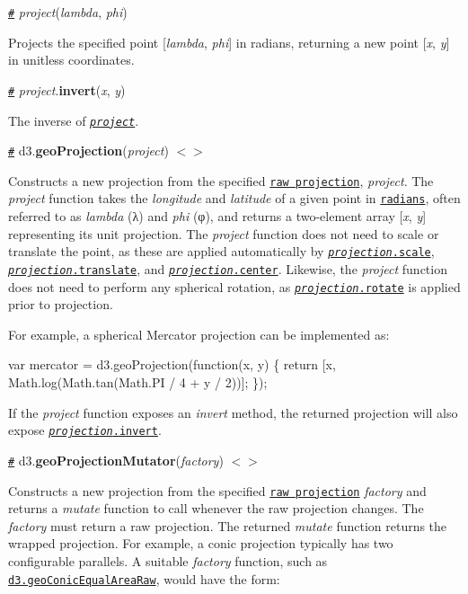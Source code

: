 \href{#_project}{\tt \#} {\itshape project}({\itshape lambda}, {\itshape phi})

Projects the specified point \mbox{[}{\itshape lambda}, {\itshape phi}\mbox{]} in radians, returning a new point \mbox{[}{\itshape x}, {\itshape y}\mbox{]} in unitless coordinates.

\href{#project_invert}{\tt \#} {\itshape project}.{\bfseries invert}({\itshape x}, {\itshape y})

The inverse of \href{#_project}{\tt {\itshape project}}.

\href{#geoProjection}{\tt \#} d3.{\bfseries geo\+Projection}({\itshape project}) \href{https://github.com/d3/d3-geo/blob/master/src/projection/index.js#L18}{\tt $<$$>$}

Constructs a new projection from the specified \href{#_project}{\tt raw projection}, {\itshape project}. The {\itshape project} function takes the {\itshape longitude} and {\itshape latitude} of a given point in \href{http://mathworld.wolfram.com/Radian.html}{\tt radians}, often referred to as {\itshape lambda} (λ) and {\itshape phi} (φ), and returns a two-\/element array \mbox{[}{\itshape x}, {\itshape y}\mbox{]} representing its unit projection. The {\itshape project} function does not need to scale or translate the point, as these are applied automatically by \href{#projection_scale}{\tt {\itshape projection}.scale}, \href{#projection_translate}{\tt {\itshape projection}.translate}, and \href{#projection_center}{\tt {\itshape projection}.center}. Likewise, the {\itshape project} function does not need to perform any spherical rotation, as \href{#projection_rotate}{\tt {\itshape projection}.rotate} is applied prior to projection.

For example, a spherical Mercator projection can be implemented as\+:


\begin{DoxyCode}
var mercator = d3.geoProjection(function(x, y) \{
  return [x, Math.log(Math.tan(Math.PI / 4 + y / 2))];
\});
\end{DoxyCode}


If the {\itshape project} function exposes an {\itshape invert} method, the returned projection will also expose \href{#projection_invert}{\tt {\itshape projection}.invert}.

\href{#geoProjectionMutator}{\tt \#} d3.{\bfseries geo\+Projection\+Mutator}({\itshape factory}) \href{https://github.com/d3/d3-geo/blob/master/src/projection/index.js#L22}{\tt $<$$>$}

Constructs a new projection from the specified \href{#_project}{\tt raw projection} {\itshape factory} and returns a {\itshape mutate} function to call whenever the raw projection changes. The {\itshape factory} must return a raw projection. The returned {\itshape mutate} function returns the wrapped projection. For example, a conic projection typically has two configurable parallels. A suitable {\itshape factory} function, such as \href{#geoConicEqualAreaRaw}{\tt d3.\+geo\+Conic\+Equal\+Area\+Raw}, would have the form\+:


